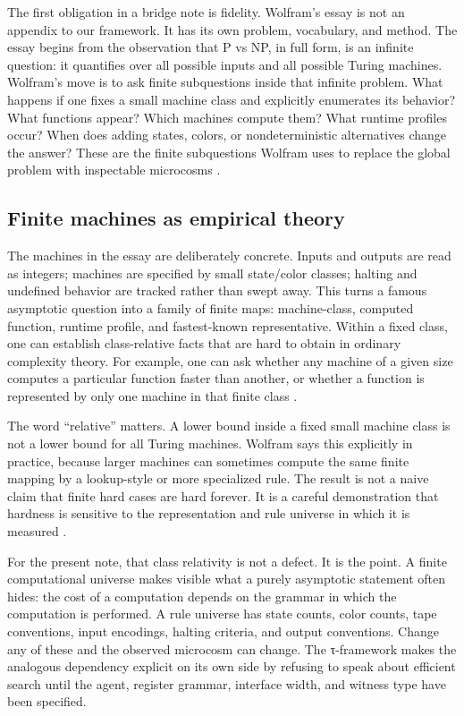 \documentclass{pantarhei-researchnote}
\begin{document}
The first obligation in a bridge note is fidelity. Wolfram's essay is not
an appendix to our framework. It has its own problem, vocabulary, and
method. The essay begins from the observation that P vs NP, in full form,
is an infinite question: it quantifies over all possible inputs and all
possible Turing machines. Wolfram's move is to ask finite subquestions
inside that infinite problem. What happens if one fixes a small machine
class and explicitly enumerates its behavior? What functions appear? Which
machines compute them? What runtime profiles occur? When does adding
states, colors, or nondeterministic alternatives change the answer? These
are the finite subquestions Wolfram uses to replace the global problem
with inspectable microcosms \cite{Wolfram2026RuliologicalPNP}.

\subsection{Finite machines as empirical theory}

The machines in the essay are deliberately concrete. Inputs and outputs
are read as integers; machines are specified by small state/color classes;
halting and undefined behavior are tracked rather than swept away. This
turns a famous asymptotic question into a family of finite maps:
machine-class, computed function, runtime profile, and fastest-known
representative. Within a fixed class, one can establish class-relative
facts that are hard to obtain in ordinary complexity theory. For example,
one can ask whether any machine of a given size computes a particular
function faster than another, or whether a function is represented by only
one machine in that finite class \cite{Wolfram2026RuliologicalPNP}.

The word ``relative'' matters. A lower bound inside a fixed small machine
class is not a lower bound for all Turing machines. Wolfram says this
explicitly in practice, because larger machines can sometimes compute the
same finite mapping by a lookup-style or more specialized rule. The result
is not a naive claim that finite hard cases are hard forever. It is a
careful demonstration that hardness is sensitive to the representation and
rule universe in which it is measured \cite{Wolfram2026RuliologicalPNP}.

For the present note, that class relativity is not a defect. It is the
point. A finite computational universe makes visible what a purely
asymptotic statement often hides: the cost of a computation depends on
the grammar in which the computation is performed. A rule universe has
state counts, color counts, tape conventions, input encodings, halting
criteria, and output conventions. Change any of these and the observed
microcosm can change. The τ-framework makes the analogous dependency
explicit on its own side by refusing to speak about efficient search
until the agent, register grammar, interface width, and witness type have
been specified.
\end{document}
